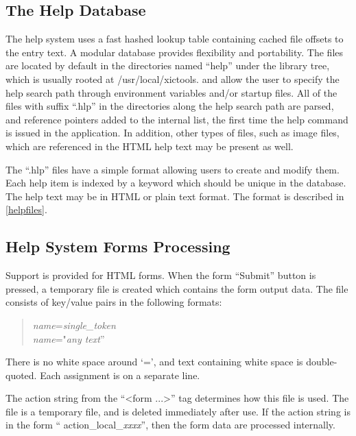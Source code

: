 \subsection{The Help Database}

The help system uses a fast hashed lookup table containing cached file
offsets to the entry text.  A modular database provides flexibility
and portability.  The files are located by default in the directories
named ``{\vt help}'' under the library tree, which is usually rooted
at {\vt /usr/local/xictools}.  {\Xic} and {\WRspice} allow the
user to specify the help search path through environment variables
and/or startup files.  All of the files with suffix ``{\vt .hlp}'' in
the directories along the help search path are parsed, and reference
pointers added to the internal list, the first time the help command
is issued in the application.  In addition, other types of files, such
as image files, which are referenced in the HTML help text may be
present as well.

The ``{\vt .hlp}'' files have a simple format allowing users to create
and modify them.  Each help item is indexed by a keyword which should
be unique in the database.  The help text may be in HTML or plain text
format.  The format is described in \ref{helpfiles}.

\subsection{Help System Forms Processing}

Support is provided for HTML forms.  When the form ``Submit'' button
is pressed, a temporary file is created which contains the form output
data.  The file consists of key/value pairs in the following formats:
\begin{quote}
{\it name\/}={\it single\_token}\\
{\it name\/}="{\it any text\/}''
\end{quote}
There is no white space around `=', and text containing white space is
double-quoted.  Each assignment is on a separate line.

The action string from the ``{\vt <form ...>}'' tag determines how   
this file is used.  The file is a temporary file, and is deleted
immediately after use.  If the action string is in the form ``{\vt   
action\_local\_}{\it xxxx\/}'', then the form data are processed
internally.

